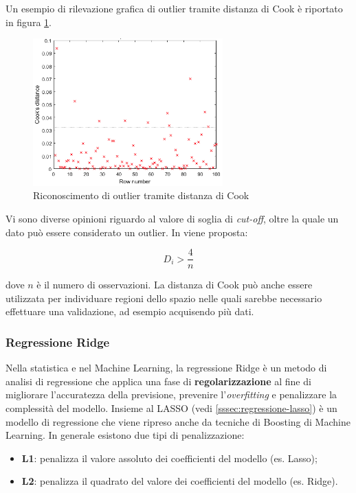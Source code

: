 Un esempio di rilevazione grafica di outlier tramite distanza di Cook è riportato in figura \ref{fig:cook}.

\begin{figure}[H]
\centering
\includegraphics[width=0.65\textwidth,height=\textheight,keepaspectratio]{img/cook.png}
\caption{Riconoscimento di outlier tramite distanza di Cook}
\label{fig:cook}
\end{figure}

Vi sono diverse opinioni riguardo al valore di soglia di \textit{cut-off}, oltre la quale un dato può essere considerato un outlier. In \cite{applied_regression} viene proposta:

$$D_{i}>\frac{4}{n}$$\smallskip

dove $n$ è il numero di osservazioni. La distanza di Cook può anche essere utilizzata per individuare regioni dello spazio nelle quali sarebbe necessario effettuare una validazione, ad esempio acquisendo più dati.

\subsubsection{Regressione Ridge}\label{sssec:regressione-ridge}
Nella statistica e nel Machine Learning, la regressione Ridge è un metodo di analisi di regressione che applica una fase di \textbf{regolarizzazione} al fine di migliorare l'accuratezza della previsione, prevenire l'\textit{overfitting} e penalizzare la complessità del modello.
Insieme al LASSO (vedi \ref{sssec:regressione-lasso}) è un modello di regressione che viene ripreso anche da tecniche di Boosting di Machine Learning. In generale esistono due tipi di penalizzazione:
\begin{itemize}
  \item \textbf{L1}: penalizza il valore assoluto dei coefficienti del modello (es. Lasso); 
  \item \textbf{L2}: penalizza il quadrato del valore dei coefficienti del modello (es. Ridge).
\end{itemize}

